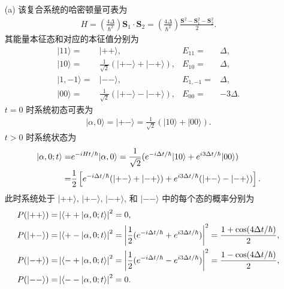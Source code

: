 \documentclass{assignment}
\begin{document}
\begin{sol}
    \begin{itemize}
        \item[(a)] 该复合系统的哈密顿量可表为
        \begin{align}
            H=\left(\frac{4\Delta}{\hbar^2}\right)\bm{S}_1\cdot\bm{S}_2=\left(\frac{4\Delta}{\hbar^2}\right)\frac{\bm{S}^2-\bm{S}_1^2-\bm{S}_2^2}{2}.
        \end{align}
        其能量本征态和对应的本征值分别为
        \begin{align}
            \lvert 11\rangle=&\lvert++\rangle,&E_{11}=&\Delta,\\
            \lvert 10\rangle=&\frac{1}{\sqrt{2}}(\lvert+-\rangle+\lvert-+\rangle),&E_{10}=&\Delta,\\
            \lvert 1,-1\rangle=&\lvert--\rangle,&E_{1,-1}=&\Delta,\\
            \lvert 00\rangle=&\frac{1}{\sqrt{2}}(\lvert +-\rangle-\lvert-+\rangle),&E_{00}=&-3\Delta.
        \end{align}
        $t=0$ 时系统初态可表为
        \begin{align}
            \lvert\alpha,0\rangle=\lvert +-\rangle=\frac{1}{\sqrt{2}}(\lvert 10\rangle+\lvert 00\rangle).
        \end{align}
        $t>0$ 时系统状态为
        \begin{align}
            \notag\lvert\alpha,0;t\rangle=&e^{-iHt/\hbar}\lvert\alpha,0\rangle=\frac{1}{\sqrt{2}}(e^{-i\Delta t/\hbar}\lvert 10\rangle+e^{i3\Delta t/\hbar}\lvert 00\rangle)\\
            =&\frac{1}{2}\left[e^{-i\Delta t/\hbar}(\lvert+-\rangle+\lvert-+\rangle)+e^{i3\Delta t/\hbar}(\lvert+-\rangle-\lvert-+\rangle)\right].
        \end{align}
        此时系统处于 $\lvert++\rangle$, $\lvert+-\rangle$, $\lvert-+\rangle$, 和 $\lvert--\rangle$ 中的每个态的概率分别为
        \begin{align}
            P(\lvert++\rangle)=&\abs{\langle++\vert\alpha,0;t\rangle}^2=0,\\
            P(\lvert+-\rangle)=&\abs{\langle+-\vert\alpha,0;t\rangle}^2=\abs{\frac{1}{2}(e^{-i\Delta t/\hbar}+e^{i3\Delta t/\hbar})}^2=\frac{1+\cos(4\Delta t/\hbar)}{2},\\
            P(\lvert-+\rangle)=&\abs{\langle-+\vert\alpha,0;t\rangle}^2=\abs{\frac{1}{2}(e^{-i\Delta t/\hbar}-e^{i3\Delta t/\hbar})}^2=\frac{1-\cos(4\Delta t/\hbar)}{2},\\
            P(\lvert--\rangle)=&\abs{\langle--\vert\alpha,0;t\rangle}^2=0.

\end{align}
\end{itemize}
\end{sol}
\end{document}
